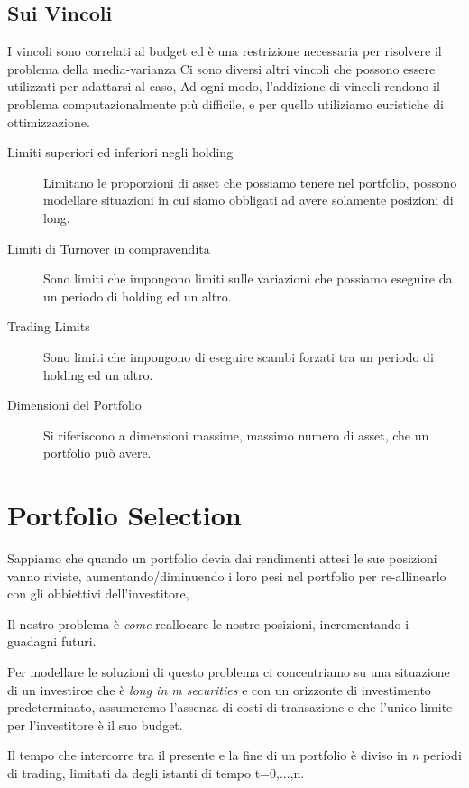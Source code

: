 \documentclass[a4paper,11pt]{report}
\begin{document}
{\subsection{Sui Vincoli}
	I vincoli sono correlati al budget ed è una restrizione necessaria per risolvere il problema della media-varianza \newline
	Ci sono diversi altri vincoli che possono essere utilizzati per adattarsi al caso, \newline
	Ad ogni modo, l'addizione di vincoli rendono il problema computazionalmente più difficile, e per quello utiliziamo euristiche di ottimizzazione.
\begin{description}
	\item[Limiti superiori ed inferiori negli holding] Limitano le proporzioni di asset che possiamo tenere nel portfolio, possono modellare situazioni in cui siamo obbligati ad avere solamente posizioni di long.
	\item[Limiti di Turnover in compravendita] Sono limiti che impongono limiti sulle variazioni che possiamo eseguire da un periodo di holding ed un altro.
	\item[Trading Limits] Sono limiti che impongono di eseguire scambi forzati tra un periodo di holding ed un altro.
	\item[Dimensioni del Portfolio] Si riferiscono a dimensioni massime, massimo numero di asset, che un portfolio può avere.
\end{description}
 \newpage

\section{Portfolio Selection}

	Sappiamo che quando un portfolio devia dai rendimenti attesi le sue posizioni vanno riviste, aumentando/diminuendo i loro pesi nel portfolio per re-allinearlo con gli obbiettivi dell'investitore,

	Il nostro problema è \emph{come} reallocare le nostre posizioni, incrementando i guadagni futuri.

	Per modellare le soluzioni di questo problema ci concentriamo su una situazione di un investiroe che è \emph{long in m securities} e con un orizzonte di investimento predeterminato, assumeremo l'assenza di costi di transazione e che l'unico limite per l'investitore è il suo budget.

\vspace*{1,5cm}
	Il tempo che intercorre tra il presente e la fine di un portfolio è diviso in \emph{n} periodi di trading, limitati da degli istanti di tempo t=0,...,n.

}
\end{document}
